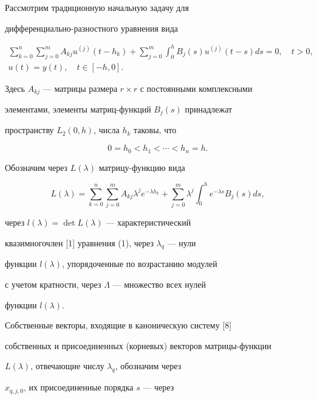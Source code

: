 Рассмотрим традиционную начальную задачу для


дифференциально-разностного уравнения вида


\begin{gather}


\sum\limits_{k=0}^n\sum\limits_{j=0}^mA_{kj}u^{(j)}(t-h_k)+


\sum\limits_{j=0}^m\int_0^h B_j(s)u^{(j)}(t-s)ds=0,\quad  t>0,\\


%


u(t)=y(t),\quad t\in[-h,0].


\end{gather}


Здесь $A_{kj}$ --- матрицы размера $r\times r$ с постоянными комплексными


элементами, элементы матриц-функций $B_j(s)$ принадлежат


пространству $L_2(0,h)$, числа $h_{k}$ таковы, что


$$


0=h_0<h_1<\dotsb<h_n=h.


$$





Обозначим через $L(\lambda)$ матрицу-функцию вида


$$


L(\lambda)=\sum\limits_{k=0}^n\sum\limits_{j=0}^m


A_{kj}\lambda^je^{-\lambda h_k}+


\sum\limits_{j=0}^m\lambda^j\int_0^h e^{-\lambda s}B_j(s)ds,


$$


через $l(\lambda)=\det L(\lambda)$ --- характеристический


квазимногочлен [1] уравнения (1), через $\lambda_q$ --- нули


функции $l(\lambda)$, упорядоченные по возрастанию модулей


с учетом кратности, через $\Lambda$ --- множество всех нулей


функции $l(\lambda)$.





Собственные векторы, входящие в каноническую систему [8]


собственных и присоединенных (корневых) векторов матрицы-функции


$L(\lambda)$, отвечающие числу $\lambda_q$, обозначим через


$x_{q,j,0}$, их присоединенные порядка $s$ --- через


